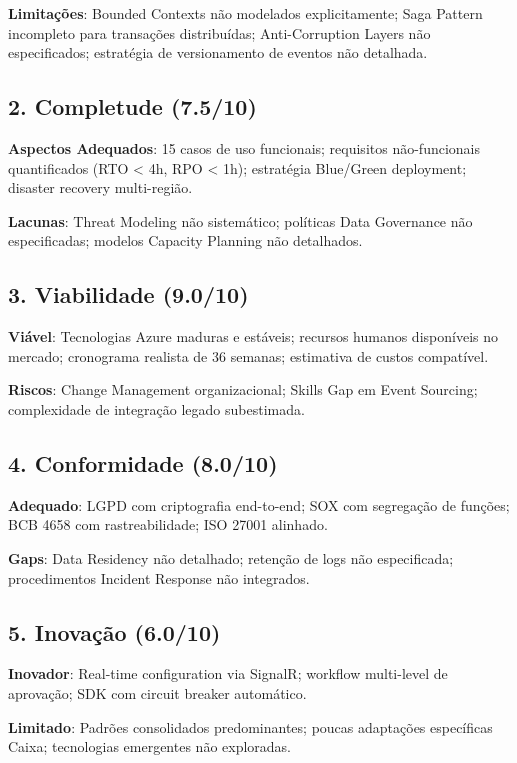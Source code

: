 \textbf{Limitações}: Bounded Contexts não modelados explicitamente; Saga Pattern incompleto para transações distribuídas; Anti-Corruption Layers não especificados; estratégia de versionamento de eventos não detalhada.

\subsection{2. Completude (7.5/10)}

\textbf{Aspectos Adequados}: 15 casos de uso funcionais; requisitos não-funcionais quantificados (RTO < 4h, RPO < 1h); estratégia Blue/Green deployment; disaster recovery multi-região.

\textbf{Lacunas}: Threat Modeling não sistemático; políticas Data Governance não especificadas; modelos Capacity Planning não detalhados.

\subsection{3. Viabilidade (9.0/10)}

\textbf{Viável}: Tecnologias Azure maduras e estáveis; recursos humanos disponíveis no mercado; cronograma realista de 36 semanas; estimativa de custos compatível.

\textbf{Riscos}: Change Management organizacional; Skills Gap em Event Sourcing; complexidade de integração legado subestimada.

\subsection{4. Conformidade (8.0/10)}

\textbf{Adequado}: LGPD com criptografia end-to-end; SOX com segregação de funções; BCB 4658 com rastreabilidade; ISO 27001 alinhado.

\textbf{Gaps}: Data Residency não detalhado; retenção de logs não especificada; procedimentos Incident Response não integrados.

\subsection{5. Inovação (6.0/10)}

\textbf{Inovador}: Real-time configuration via SignalR; workflow multi-level de aprovação; SDK com circuit breaker automático.

\textbf{Limitado}: Padrões consolidados predominantes; poucas adaptações específicas Caixa; tecnologias emergentes não exploradas.

